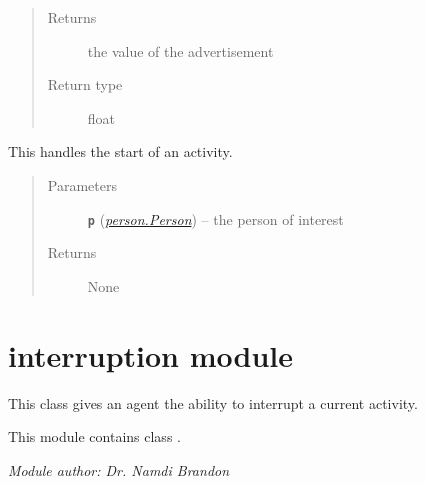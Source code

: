 \documentclass[letterpaper,10pt,english]{sphinxmanual}
\begin{document}
\begin{fulllineitems}
\begin{fulllineitems}
\begin{quote}
\begin{description}
\begin{itemize}
\end{itemize}

\item[{Returns}] \leavevmode
the value of the advertisement

\item[{Return type}] \leavevmode
float

\end{description}\end{quote}

\end{fulllineitems}


\begin{fulllineitems}
\label{interrupt:interrupt.Interrupt.start}
This handles the start of an activity.
\begin{quote}\begin{description}
\item[{Parameters}] \leavevmode
\textbf{\texttt{p}} ({\hyperref[person:person.Person]{\emph{\emph{person.Person}}}}) -- the person of interest

\item[{Returns}] \leavevmode
None

\end{description}\end{quote}

\end{fulllineitems}


\end{fulllineitems}



\section{interruption module}
\label{interruption::doc}\label{interruption:module-interruption}\label{interruption:interruption-module}
This class gives an agent the ability to interrupt a current activity.

This module contains class {\hyperref[interruption:interruption.Interruption]{\emph{}}}.

\emph{Module author: Dr. Namdi Brandon}
\end{document}
